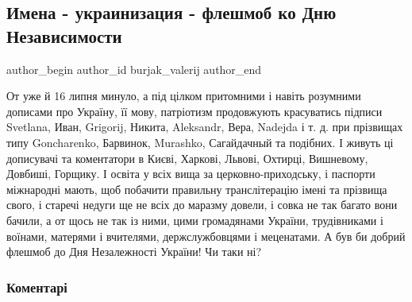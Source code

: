  
 
 
 
 
 
\subsection{Имена - украинизация - флешмоб ко Дню Независимости}
\label{sec:28_07_2021.fb.burjak_valerij.1.ukrainizacia_mova_imena}
 
\ifcmt
 author_begin
   author_id burjak_valerij
 author_end
\fi

От уже й 16 липня минуло, а під цілком притомними і навіть розумними дописами
про Україну, її мову, патріотизм продовжують красуватись підписи Svetlana,
Иван, Grigorij, Никита, Aleksandr, Вера, Nadejda і т. д. при прізвищах типу
Goncharenko, Барвинок, Murashko, Сагайдачный та подібних. І живуть ці
дописувачі та коментатори в Києві, Харкові, Львові, Охтирці, Вишневому,
Довбиші, Горщику. І освіта у всіх вища за церковно-приходську, і паспорти
міжнародні мають, щоб побачити правильну транслітерацію імені та прізвища
свого, і старечі недуги ще не всіх до маразму довели, і совка не так багато
вони бачили, а от щось не так із ними, цими громадянами України, трудівниками і
воїнами, матерями і вчителями, держслужбовцями і меценатами. А був би добрий
флешмоб до Дня Незалежності України! Чи таки ні?

\subsubsection{Коментарі}

